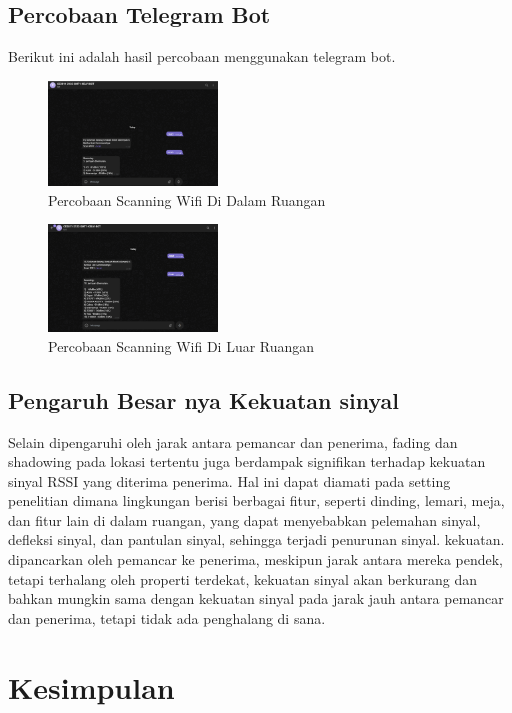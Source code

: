 \documentclass[conference]{IEEEtran}
\begin{document}
        \subsection{Percobaan Telegram Bot}
        Berikut ini adalah hasil percobaan menggunakan telegram bot.
        \begin{figure}[h]
            \centering
            \includegraphics[width=0.4\textwidth]{2.png}
            \caption{Percobaan Scanning Wifi Di Dalam Ruangan}
        \end{figure}
        \begin{figure}[h]
            \centering
            \includegraphics[width=0.4\textwidth]{luarrumah.png}
            \caption{Percobaan Scanning Wifi Di Luar Ruangan}
        \end{figure}
    
        \subsection{Pengaruh Besar nya Kekuatan sinyal}
Selain dipengaruhi oleh jarak antara pemancar dan penerima, fading dan shadowing pada lokasi tertentu juga berdampak signifikan terhadap kekuatan sinyal RSSI yang diterima penerima. Hal ini dapat diamati pada setting penelitian dimana lingkungan berisi berbagai fitur, seperti dinding, lemari, meja, dan fitur lain di dalam ruangan, yang dapat menyebabkan pelemahan sinyal, defleksi sinyal, dan pantulan sinyal, sehingga terjadi penurunan sinyal. kekuatan. dipancarkan oleh pemancar ke penerima, meskipun jarak antara mereka pendek, tetapi terhalang oleh properti terdekat, kekuatan sinyal akan berkurang dan bahkan mungkin sama dengan kekuatan sinyal pada jarak jauh antara pemancar dan penerima, tetapi tidak ada penghalang di sana.

\section{Kesimpulan}
\end{document}
